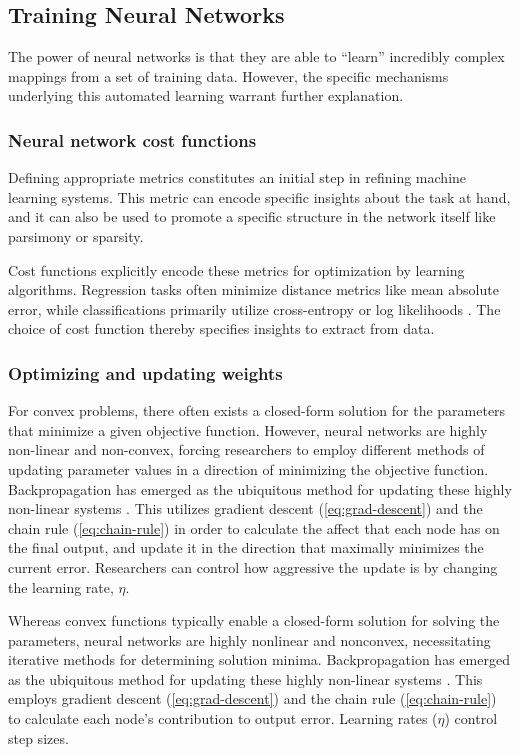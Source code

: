 \subsection{Training Neural Networks}

The power of neural networks is that they are able to ``learn'' incredibly complex mappings from a set of training data.
However, the specific mechanisms underlying this automated learning warrant further explanation.

\subsubsection{Neural network cost functions}

Defining appropriate metrics constitutes an initial step in refining machine learning systems.
This metric can encode specific insights about the task at hand, and it can also be used to promote a specific structure in the network itself like parsimony or sparsity.

Cost functions explicitly encode these metrics for optimization by learning algorithms.
Regression tasks often minimize distance metrics like mean absolute error, while classifications primarily utilize cross-entropy or log likelihoods \cite{paszkePyTorchImperativeStyle2019}.
The choice of cost function thereby specifies insights to extract from data.

\subsubsection{Optimizing and updating weights}

For convex problems, there often exists a closed-form solution for the parameters that minimize a given objective function.
However, neural networks are highly non-linear and non-convex, forcing researchers to employ different methods of updating parameter values in a direction of minimizing the objective function.
Backpropagation has emerged as the ubiquitous method for updating these highly non-linear systems \cite{rumelhartLearningRepresentationsBackpropagating1986}.
This utilizes gradient descent (\cref{eq:grad-descent}) and the chain rule (\cref{eq:chain-rule}) in order to calculate the affect that each node has on the final output, and update it in the direction that maximally minimizes the current error.
Researchers can control how aggressive the update is by changing the learning rate, $\eta$.

Whereas convex functions typically enable a closed-form solution \cite{boydConvexOptimization2004} for solving the parameters, neural networks are highly nonlinear and nonconvex, necessitating iterative methods for determining solution minima.
Backpropagation has emerged as the ubiquitous method for updating these highly non-linear systems \cite{rumelhartLearningRepresentationsBackpropagating1986}.
This employs gradient descent (\cref{eq:grad-descent}) and the chain rule (\cref{eq:chain-rule}) to calculate each node's contribution to output error.
Learning rates ($\eta$) control step sizes.


